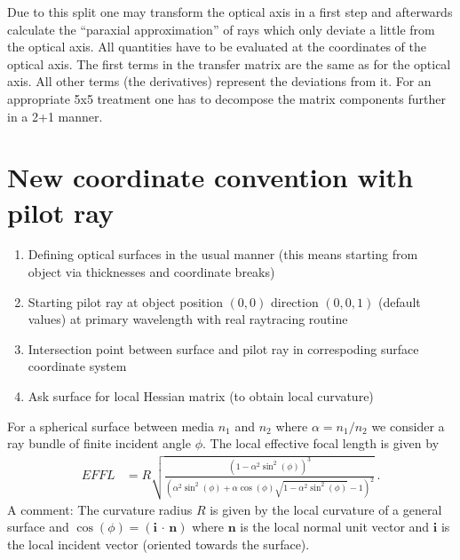 \documentclass[12pt,a4paper,twoside,openright,BCOR10mm,headsepline,titlepage,abstracton,chapterprefix,final]{scrreprt}
\newcommand\Vector[1]{{\mathbf{#1}}}
\newcommand{\scpm}[2]{(#1\,\cdot\,#2)}
\begin{document}
Due to this split one may transform the optical axis in a first step and afterwards calculate the ``paraxial approximation'' of rays which
only deviate a little from the optical axis. All quantities have to be evaluated at the coordinates of the optical axis. The first terms
in the transfer matrix are the same as for the optical axis. All other terms (the derivatives) represent the deviations from it.
For an appropriate 5x5 treatment one has to decompose the matrix components further in a 2+1 manner.
\section{New coordinate convention with pilot ray}
\begin{enumerate}
 \item Defining optical surfaces in the usual manner (this means starting from object via thicknesses and coordinate breaks)
 \item Starting pilot ray at object position $(0, 0)$ direction $(0, 0, 1)$ (default values) at primary wavelength with real raytracing routine
 \item Intersection point between surface and pilot ray in correspoding surface coordinate system
 \item Ask surface for local Hessian matrix (to obtain local curvature)
\end{enumerate}
For a spherical surface between media $n_1$ and $n_2$ where $\alpha = n_1/n_2$ we consider a ray bundle
of finite incident angle $\phi$.
The local effective focal length is given by
\begin{align}
 EFFL &= R \sqrt{\frac{\left(1- \alpha ^2 \sin ^2(\phi )\right)^3}{\left(\alpha ^2 \sin ^2(\phi )+\alpha \cos (\phi ) \sqrt{1-\alpha ^2 \sin ^2(\phi )}-1\right)^2}}\,.
\end{align}
A comment: The curvature radius $R$ is given by the local curvature of a general surface and $\cos(\phi) = \scpm{\Vector{i}}{\Vector{n}}$
where $\Vector{n}$ is the local normal unit vector and $\Vector{i}$ is the local incident vector (oriented towards the surface).
\end{document}
